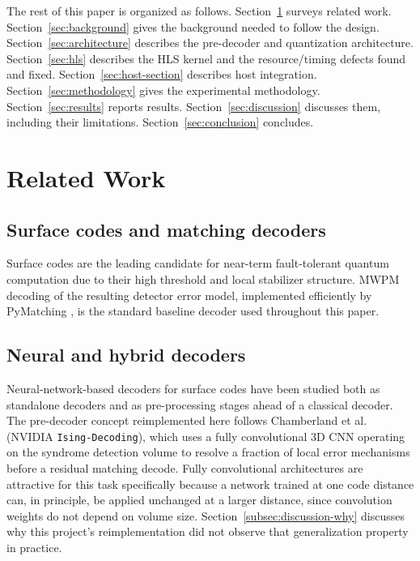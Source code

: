 \documentclass[pdflatex,sn-basic]{sn-jnl}
\begin{document}
The rest of this paper is organized as follows. Section~\ref{sec:related} surveys related work. Section~\ref{sec:background} gives the background needed to follow the design. Section~\ref{sec:architecture} describes the pre-decoder and quantization architecture. Section~\ref{sec:hls} describes the HLS kernel and the resource/timing defects found and fixed. Section~\ref{sec:host-section} describes host integration. Section~\ref{sec:methodology} gives the experimental methodology. Section~\ref{sec:results} reports results. Section~\ref{sec:discussion} discusses them, including their limitations. Section~\ref{sec:conclusion} concludes.

\section{Related Work}\label{sec:related}

\subsection{Surface codes and matching decoders}\label{subsec:rel-surface}
Surface codes \cite{fowler2012surface} are the leading candidate for near-term fault-tolerant quantum computation due to their high threshold and local stabilizer structure. MWPM decoding of the resulting detector error model, implemented efficiently by PyMatching \cite{higgott2022pymatching}, is the standard baseline decoder used throughout this paper.

\subsection{Neural and hybrid decoders}\label{subsec:rel-neural}
Neural-network-based decoders for surface codes have been studied both as standalone decoders and as pre-processing stages ahead of a classical decoder. The pre-decoder concept reimplemented here follows Chamberland et al.\ \cite{chamberland2026fast} (NVIDIA \texttt{Ising-Decoding}), which uses a fully convolutional 3D CNN operating on the syndrome detection volume to resolve a fraction of local error mechanisms before a residual matching decode. Fully convolutional architectures are attractive for this task specifically because a network trained at one code distance can, in principle, be applied unchanged at a larger distance, since convolution weights do not depend on volume size. Section~\ref{subsec:discussion-why} discusses why this project's reimplementation did not observe that generalization property in practice.
\end{document}
